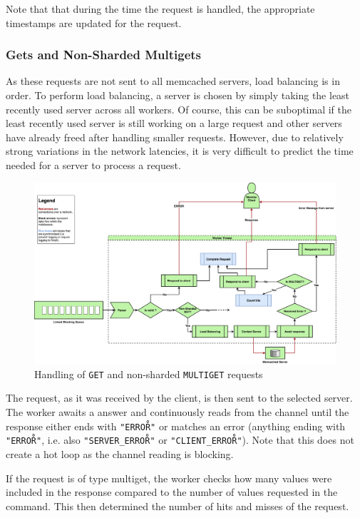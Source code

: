 \documentclass[11pt,a4paper]{article}
\begin{document}
Note that that during the time the request is handled, the appropriate timestamps are updated for the request.

\subsubsection{Gets and Non-Sharded Multigets}
As these requests are not sent to all memcached servers, load balancing is in order. To perform load balancing, a server is chosen by simply taking the least recently used server across all workers. Of course, this can be suboptimal if the least recently used server is still working on a large request and other servers have already freed after handling smaller requests. However, due to relatively strong variations in the network latencies, it is very difficult to predict the time needed for a server to process a request.

\begin{figure}[h]
    \centering
    \includegraphics[width=\textwidth]{processing/graphics/gets_handling.png}
    \caption{Handling of \texttt{GET} and non-sharded \texttt{MULTIGET} requests}
    \label{png::gets_handling}
\end{figure}

The request, as it was received by the client, is then sent to the selected server. The worker awaits a answer and continuously reads from the channel until the response either ends with \texttt{"ERROR\r\n"} or matches an error (anything ending with \texttt{"ERROR\r\n"}, i.e. also \texttt{"SERVER_ERROR\r\n"} or \texttt{"CLIENT_ERROR\r\n"}). Note that this does not create a hot loop as the channel reading is blocking.

If the request is of type multiget, the worker checks how many values were included in the response compared to the number of values requested in the command. This then determined the number of hits and misses of the request.
\end{document}
